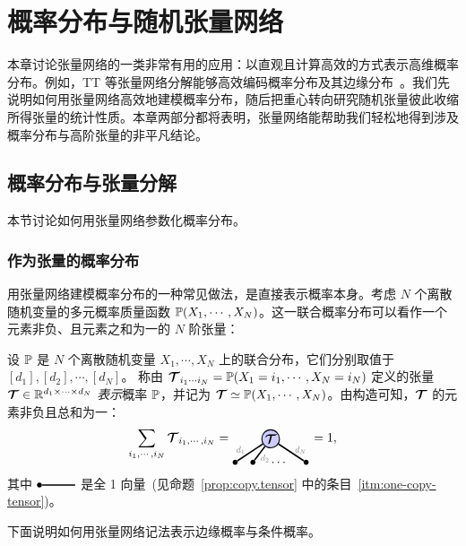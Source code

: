 \section{概率分布与随机张量网络}\label{chapter:prob}
本章讨论张量网络的一类非常有用的应用：以直观且计算高效的方式表示高维概率分布。例如，TT 等张量网络分解能够高效编码概率分布及其边缘分布~\citep{gardiner2024tensor, glasser2019expressive}。我们先说明如何用张量网络高效地建模概率分布，随后把重心转向研究随机张量彼此收缩所得张量的统计性质。本章两部分都将表明，张量网络能帮助我们轻松地得到涉及概率分布与高阶张量的非平凡结论。 
\subsection{概率分布与张量分解}
本节讨论如何用张量网络参数化概率分布。
\subsubsection{作为张量的概率分布}\label{sub:probs}
 用张量网络建模概率分布的一种常见做法，是直接表示概率本身。考虑 $N$ 个离散随机变量的多元概率质量函数 $\mathbb{P}(X_1,\cdots,X_N)$。这一联合概率分布可以看作一个元素非负、且元素之和为一的 $N$ 阶张量： 
\begin{definition}\label{def:probability}
设 $\mathbb{P}$ 是 $N$ 个离散随机变量 $X_1,\cdots,X_N$ 上的联合分布，它们分别取值于 $[d_1], [d_2], \cdots,[d_N]$。 
称由 $\bm{\mathcal{T}}_{i_1\cdots i_N} = \mathbb{P}(X_1=i_1,\cdots,X_N=i_N)$ 定义的张量 $\bm{\mathcal{T}}\in\mathbb{R}^{d_1\times\cdots\times d_N}$ \emph{表示}概率 $\mathbb{P}$，并记为 $\bm{\mathcal{T}} \simeq  \mathbb{P}(X_1,\cdots,X_N)$。由构造可知，$\bm{\mathcal{T}}$ 的元素非负且总和为一： 
$$
\sum_{i_1,\cdots,i_N}\Tt_{i_1,\cdots,i_N} 
=
\begin{tikzpicture}[baseline=\baseline]
    \tikzset{tensor/.style = {minimum size = 0.5cm,shape = circle,thick,draw=black,inner sep = 0pt}, edge/.style = {thick,line width=.4mm},every loop/.style={}}
    \def\x{0}
    \def\y{0}
    \node[tensor,fill=blue!20!white] (T) at (\x+1,\y) {$\Tt$};
    \draw  node[fill = black,circle,inner sep=0pt,minimum size=4pt] (m_1) at (\x,\y-0.65) {};
    \draw  node[fill = black,circle,inner sep=0pt,minimum size=4pt] (m_2) at (\x+0.5,\y-0.65) {};
    \draw  node[fill = black,circle,inner sep=0pt,minimum size=4pt] (m_3) at (\x+2,\y-0.65) {};
    \node[draw=none] at (\x+1.25,\y-0.65){$\dots$};
    \draw[edge] (T) -- (m_1)node [very near end,above]
    {\scalebox{0.7}{\dimcolor{$d_1$}}};
    \draw[edge] (T) -- (m_2)node [very near end,right]
    {\scalebox{0.7}{\dimcolor{$d_2$}}};
    \draw[edge] (T) -- (m_3)node [very near end,above]
    {\scalebox{0.7}{\dimcolor{$d_N$}}};
\end{tikzpicture}
= 1,
$$
其中 $
\begin{tikzpicture}[baseline=\baseline]
    \tikzset{tensor/.style = {minimum size = 0.5cm,shape = circle,thick,draw=black,inner sep = 0pt}, edge/.style = {thick,line width=.4mm},every loop/.style={}}
    \def\x{0}
    \def\y{0}
    \draw  node[fill = black,circle,inner sep=0pt,minimum size=4pt] (m_1) at (\x,\y) {};
    \draw[edge](m_1)--(\x+1,\y);
    \end{tikzpicture}
$
是全 1 向量~(见命题~\ref{prop:copy.tensor} 中的条目~\ref{itm:one-copy-tensor})。
\end{definition}
下面说明如何用张量网络记法表示边缘概率与条件概率。
